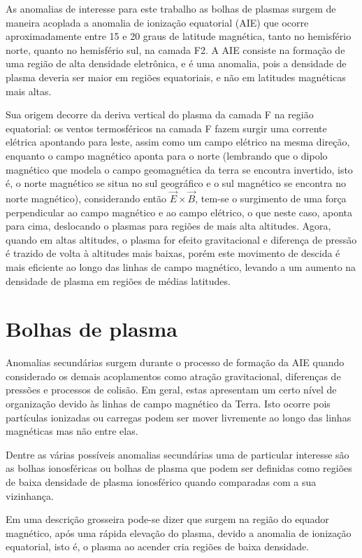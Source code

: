As anomalias de interesse para este trabalho as bolhas de plasmas surgem de maneira acoplada a anomalia de ionização equatorial (AIE) que ocorre aproximadamente entre 15 e 20 graus de latitude magnética, tanto no hemisfério norte, quanto no hemisfério sul, na camada F2. A AIE consiste na formação de uma região de alta densidade eletrônica, e é uma anomalia, pois a densidade de plasma deveria ser maior em regiões equatoriais, e não em latitudes magnéticas mais altas.

Sua origem decorre da deriva vertical do plasma da camada F na região equatorial: os ventos termosféricos na camada F fazem surgir uma corrente elétrica apontando para leste, assim como um campo elétrico na mesma direção, enquanto o campo magnético aponta para o norte (lembrando que o dipolo magnético que modela o campo geomagnética da terra se encontra invertido, isto é, o norte magnético se situa no sul geográfico e o sul magnético se encontra no norte magnético), considerando então $\vec{E}\times\vec{B}$, tem-se o surgimento de uma força perpendicular ao campo magnético e ao campo elétrico, o que neste caso, aponta para cima, deslocando o plasmas para regiões de mais alta altitudes. Agora, quando em altas altitudes, o plasma for efeito gravitacional e diferença de pressão é trazido de volta à altitudes mais baixas, porém este movimento de descida é mais eficiente ao longo das linhas de campo magnético, levando a um aumento na densidade de plasma em regiões de médias latitudes.

\section{Bolhas de plasma}

Anomalias secundárias surgem durante o processo de formação da AIE quando considerado os demais acoplamentos como atração gravitacional, diferenças de pressões e processos de colisão. Em geral, estas apresentam um certo nível de organização devido às linhas de campo magnético da Terra. Isto ocorre pois partículas ionizadas ou carregas podem ser mover livremente ao longo das linhas magnéticas mas não entre elas.

Dentre as várias possíveis anomalias secundárias uma de particular interesse são as bolhas ionosféricas ou bolhas de plasma que podem ser definidas como regiões de baixa densidade de plasma ionosférico quando comparadas com a sua vizinhança. 

Em uma descrição grosseira pode-se dizer que surgem na região do equador magnético, após uma rápida elevação do plasma, devido a anomalia de ionização equatorial, isto é, o plasma ao acender cria regiões de baixa densidade.

